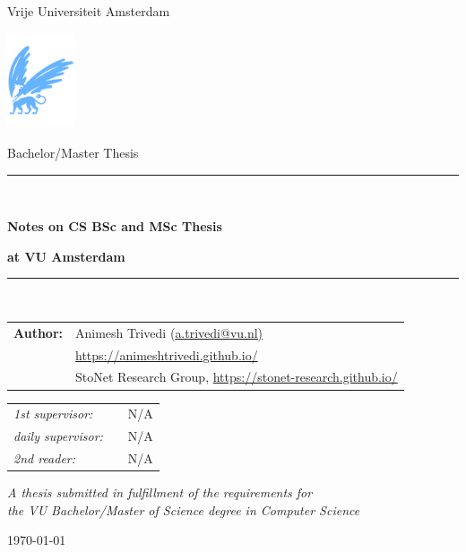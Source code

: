 \documentclass[11pt]{article}
\begin{document}
\thispagestyle{empty}

\begin{center}

Vrije Universiteit Amsterdam

\vspace{1mm}

\includegraphics[height=28mm]{vu-griffioen.pdf}

\vspace{1.5cm}

{\Large Bachelor/Master Thesis}

\vspace*{1.5cm}

\rule{.9\linewidth}{.6pt}\\[0.4cm]
{\huge \bfseries Notes on CS BSc and MSc Thesis \par}
{\huge \bfseries  at VU Amsterdam \par}\vspace{0.4cm}
\rule{.9\linewidth}{.6pt}\\[1.5cm]

\vspace*{2mm}

{\normalsize 
\begin{tabular}{ll}
{\bf Author:} & Animesh Trivedi (\href{mailto:a.trivedi@vu.nl}{a.trivedi@vu.nl)} \\
& \url{https://animeshtrivedi.github.io/} \\ 
& StoNet Research Group, \url{https://stonet-research.github.io/} \\ 
\end{tabular}
}

\vspace*{1.5cm}

\begin{tabular}{ll}
{\it 1st supervisor:}   & ~~N/A \\
{\it daily supervisor:} & ~~N/A \\
{\it 2nd reader:}       & ~~N/A 
\end{tabular}

\vspace*{2cm}

\textit{A thesis submitted in fulfillment of the requirements for\\ the VU Bachelor/Master of Science degree in Computer Science }

\vspace*{1cm}

\today\\[4cm] %

\end{center}
\end{document}
